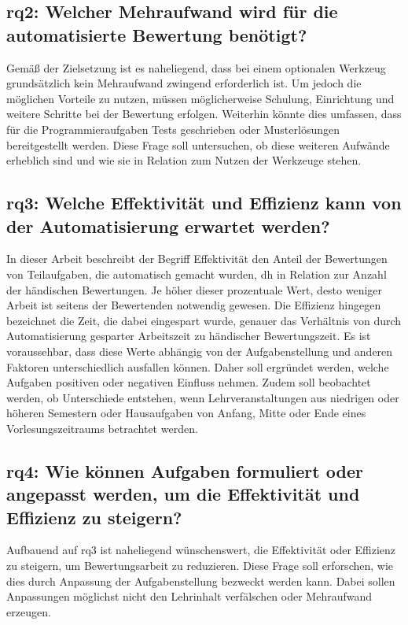 \subsection[\acs{rq}2]{\ac{rq}2: Welcher Mehraufwand wird für die automatisierte Bewertung benötigt?}\label{subsec:rq2-additional-effort}

Gemäß der Zielsetzung ist es naheliegend, dass bei einem optionalen Werkzeug grundsätzlich kein Mehraufwand zwingend erforderlich ist.
Um jedoch die möglichen Vorteile zu nutzen, müssen möglicherweise Schulung, Einrichtung und weitere Schritte bei der Bewertung erfolgen.
Weiterhin könnte dies umfassen, dass für die Programmieraufgaben Tests geschrieben oder Musterlösungen bereitgestellt werden.
Diese Frage soll untersuchen, ob diese weiteren Aufwände erheblich sind und wie sie in Relation zum Nutzen der Werkzeuge stehen.

\subsection[\acs{rq}3]{\ac{rq}3: Welche Effektivität und Effizienz kann von der Automatisierung erwartet werden?}\label{subsec:rq3-effectivity-efficiency}

In dieser Arbeit beschreibt der Begriff Effektivität den Anteil der Bewertungen von Teilaufgaben, die automatisch gemacht wurden, \ac{dh} in Relation zur Anzahl der händischen Bewertungen.
Je höher dieser prozentuale Wert, desto weniger Arbeit ist seitens der Bewertenden notwendig gewesen.
Die Effizienz hingegen bezeichnet die Zeit, die dabei eingespart wurde, genauer das Verhältnis von durch Automatisierung gesparter Arbeitszeit zu händischer Bewertungszeit.
Es ist voraussehbar, dass diese Werte abhängig von der Aufgabenstellung und anderen Faktoren unterschiedlich ausfallen können.
Daher soll ergründet werden, welche Aufgaben positiven oder negativen Einfluss nehmen.
Zudem soll beobachtet werden, ob Unterschiede entstehen, wenn Lehrveranstaltungen aus niedrigen oder höheren Semestern oder Hausaufgaben von Anfang, Mitte oder Ende eines Vorlesungszeitraums betrachtet werden.

\subsection[\acs{rq}4]{\ac{rq}4: Wie können Aufgaben formuliert oder angepasst werden, um die Effektivität und Effizienz zu steigern?}\label{subsec:rq4-improve-effectivity-efficiency}

Aufbauend auf \acs{rq}3 ist naheliegend wünschenswert, die Effektivität oder Effizienz zu steigern, um Bewertungsarbeit zu reduzieren.
Diese Frage soll erforschen, wie dies durch Anpassung der Aufgabenstellung bezweckt werden kann.
Dabei sollen Anpassungen möglichst nicht den Lehrinhalt verfälschen oder Mehraufwand erzeugen.


